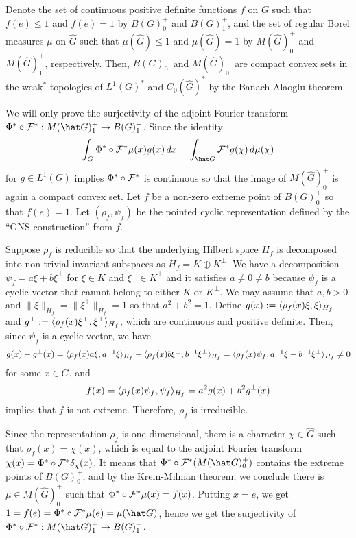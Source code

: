 \documentclass[a4paper]{article}
\begin{document}
\begin{pf}
Denote the set of continuous positive definite functions $f$ on $G$ such that $f(e)\le1$ and $f(e)=1$ by $B(G)_0^+$ and $B(G)_1^+$, and the set of regular Borel measures $\mu$ on $\hat G$ such that $\mu(\hat G)\le1$ and $\mu(\hat G)=1$ by $M(\hat G)_0^+$ and $M(\hat G)_1^+$, respectively.
Then, $B(G)_0^+$ and $M(\hat G)_0^+$ are compact convex sets in the weak$^*$ topologies of $L^1(G)^*$ and $C_0(\hat G)^*$ by the Banach-Alaoglu theorem.

We will only prove the surjectivity of the adjoint Fourier transform $\Phi^*\circ\cF^*:M(\hat G)_1^+\to B(G)_1^+$.
Since the identity
\[\int_G\Phi^*\circ\cF^*\mu(x)g(x)\,dx=\int_{\hat G}\cF^*g(\chi)\,d\mu(\chi)\]
for $g\in L^1(G)$ implies $\Phi^*\circ\mathcal{F}^*$ is continuous so that the image of $M(\hat G)_0^+$ is again a compact convex set.
Let $f$ be a non-zero extreme point of $B(G)_0^+$ so that $f(e)=1$.
Let $(\rho_f,\psi_f)$ be the pointed cyclic representation defined by the ``GNS construction'' from $f$.

Suppose $\rho_f$ is reducible so that the underlying Hilbert space $H_f$ is decomposed into non-trivial invariant subspaces as $H_f=K\oplus K^\perp$.
We have a decomposition $\psi_f=a\xi+b\xi^\perp$ for $\xi\in K$ and $\xi^\perp\in K^\perp$ and it satisfies $a\ne0\ne b$ because $\psi_f$ is a cyclic vector that cannot belong to either $K$ or $K^\perp$.
We may assume that $a,b>0$ and $\|\xi\|_{H_f}=\|\xi^\perp\|_{H_f}=1$ so that $a^2+b^2=1$.
Define $g(x):=\langle\rho_f(x)\xi,\xi\rangle_{H_f}$ and $g^\perp:=\langle\rho_f(x)\xi^\perp,\xi^\perp\rangle_{H_f}$, which are continuous and positive definite.
Then, since $\psi_f$ is a cyclic vector, we have
\[g(x)-g^\perp(x)=\langle\rho_f(x)a\xi,a^{-1}\xi\rangle_{H_f}-\langle\rho_f(x)b\xi^\perp,b^{-1}\xi^\perp\rangle_{H_f}=\langle\rho_f(x)\psi_f,a^{-1}\xi-b^{-1}\xi^\perp\rangle_{H_f}\ne0\]
for some $x\in G$, and
\[f(x)=\langle\rho_f(x)\psi_f,\psi_f\rangle_{H_f}=a^2g(x)+b^2g^\perp(x)\]
implies that $f$ is not extreme.
Therefore, $\rho_f$ is irreducible.

Since the representation $\rho_f$ is one-dimensional, there is a character $\chi\in\hat G$ such that $\rho_f(x)=\chi(x)$, which is equal to the adjoint Fourier transform $\chi(x)=\Phi^*\circ\mathcal{F}^*\delta_\chi(x)$.
It means that $\Phi^*\circ\cF^*(M(\hat G)_0^+)$ contains the extreme points of $B(G)_0^+$, and by the Krein-Milman theorem, we conclude there is $\mu\in M(\hat G)_0^+$ such that $\Phi^*\circ\mathcal{F}^*\mu(x)=f(x)$.
Putting $x=e$, we get $1=f(e)=\Phi^*\circ\cF^*\mu(e)=\mu(\hat G)$, hence we get the surjectivity of $\Phi^*\circ\cF^*:M(\hat G)_1^+\to B(G)_1^+$.
\end{pf}
\end{document}
